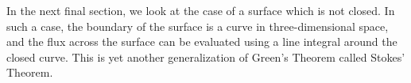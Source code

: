 In the next final section, we look at the case of a surface which is not closed.  In such a case, the boundary of the surface is a curve in three-dimensional space, and the flux across the surface can be evaluated using a line integral around the closed curve.  This is yet another generalization of Green's Theorem called Stokes' Theorem.


